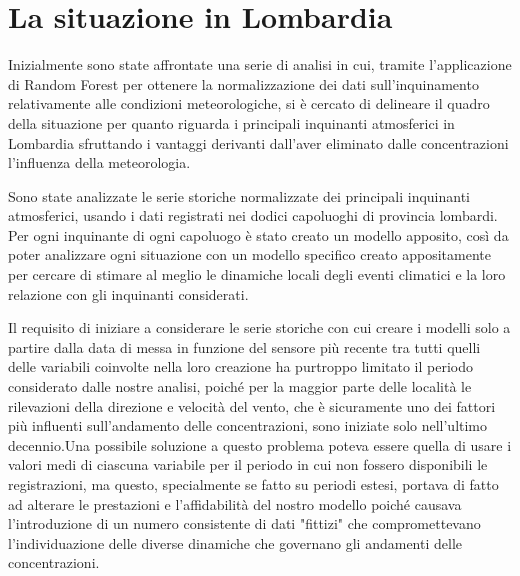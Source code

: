 




\chapter{La situazione in Lombardia}
Inizialmente sono state affrontate una serie di analisi in cui, tramite l'applicazione di Random Forest
per ottenere la normalizzazione dei dati sull'inquinamento relativamente alle condizioni meteorologiche, si è cercato di delineare il quadro della situazione per quanto riguarda i principali inquinanti atmosferici in Lombardia sfruttando i vantaggi derivanti dall'aver eliminato dalle concentrazioni l'influenza della meteorologia.

Sono state analizzate le serie storiche normalizzate dei principali inquinanti atmosferici, usando i dati registrati nei dodici capoluoghi di provincia lombardi. Per ogni inquinante di ogni capoluogo è stato creato un modello apposito, così da poter analizzare ogni situazione con un modello specifico creato appositamente per cercare di stimare al meglio le dinamiche locali degli eventi climatici e la loro relazione con gli inquinanti considerati. 

Il requisito di iniziare a considerare le serie storiche con cui creare i modelli solo a partire dalla data di messa in funzione del sensore più recente tra tutti quelli delle variabili coinvolte nella loro creazione ha purtroppo limitato il periodo considerato dalle nostre analisi, poiché per la maggior parte delle località le rilevazioni della direzione e velocità del vento, che è sicuramente uno dei fattori più influenti sull'andamento delle concentrazioni, sono iniziate solo nell'ultimo decennio.Una possibile soluzione a questo problema poteva essere quella di usare i valori medi di ciascuna variabile per il periodo in cui non fossero disponibili le registrazioni, ma questo, specialmente se fatto su periodi estesi, portava di fatto ad alterare le prestazioni e l'affidabilità del nostro modello poiché causava l'introduzione di un numero consistente di dati "fittizi"
 che compromettevano l'individuazione delle diverse dinamiche che governano gli andamenti delle concentrazioni.

